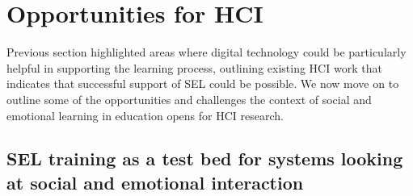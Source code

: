 \documentclass[prodmode,acmtochi]{acmsmall}
\begin{document}



\section{Opportunities for HCI}
Previous section highlighted areas where digital technology could be particularly helpful in supporting the learning process, outlining existing HCI work that indicates that successful support of SEL could be possible. 
%
We now move on to outline some of the opportunities and challenges the context of social and emotional learning in education opens for HCI research. 

\subsection{SEL training as a test bed for systems looking at social and emotional interaction}
\end{document}
